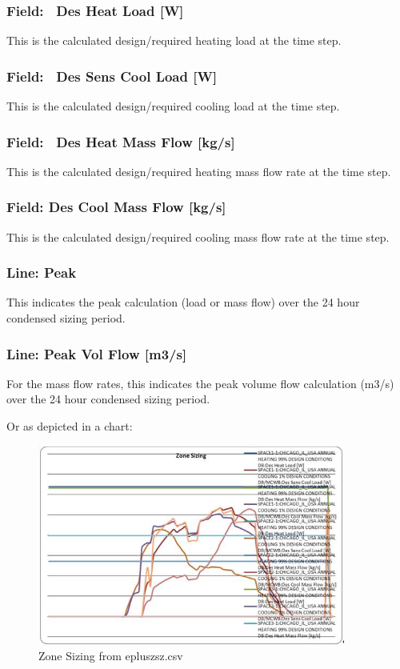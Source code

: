\subsubsection{Field:~ Des Heat Load {[}W{]}}\label{field-des-heat-load-w}

This is the calculated design/required heating load at the time step.

\subsubsection{Field:~ Des Sens Cool Load {[}W{]}}\label{field-des-sens-cool-load-w}

This is the calculated design/required cooling load at the time step.

\subsubsection{Field:~ Des Heat Mass Flow {[}kg/s{]}}\label{field-des-heat-mass-flow-kgs-000}

This is the calculated design/required heating mass flow rate at the time step.

\subsubsection{Field: Des Cool Mass Flow {[}kg/s{]}}\label{field-des-cool-mass-flow-kgs-000}

This is the calculated design/required cooling mass flow rate at the time step.

\subsubsection{Line: Peak}\label{line-peak}

This indicates the peak calculation (load or mass flow) over the 24 hour condensed sizing period.

\subsubsection{Line: Peak Vol Flow {[}m3/s{]}}\label{line-peak-vol-flow-m3s}

For the mass flow rates, this indicates the peak volume flow calculation (m3/s) over the 24 hour condensed sizing period.

Or as depicted in a chart:

\begin{figure}[hbtp] %
\centering
\includegraphics[width=0.9\textwidth, height=0.9\textheight, keepaspectratio=true]{media/image018.jpg}
\caption{Zone Sizing from epluszsz.csv \protect \label{fig:zone-sizing-from-epluszsz.csv}}
\end{figure}
